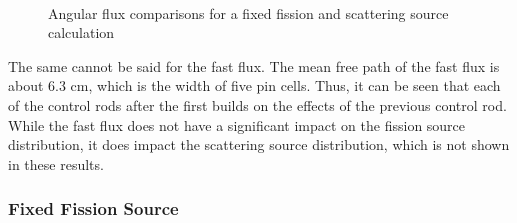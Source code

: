 \begin{figure}[H]
  \centering
  ~
  \caption{Angular flux comparisons for a fixed fission and scattering source calculation}\label{f:1dmoc-fixed-50-angflux}
\end{figure}

The same cannot be said for the fast flux.  The mean free path of the fast flux is about 6.3 cm, which is the width of five pin cells.  Thus, it can be seen that each of the control rods after the first builds on the effects of the previous control rod.  While the fast flux does not have a significant impact on the fission source distribution, it does impact the scattering source distribution, which is not shown in these results.

\subsubsection{Fixed Fission Source}

